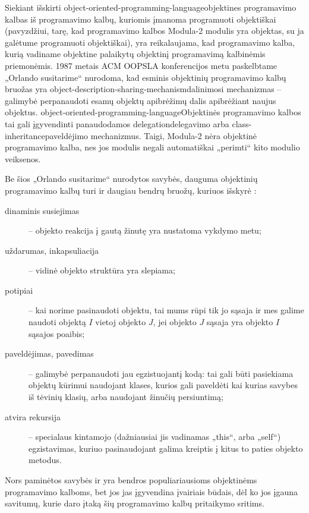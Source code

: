 Siekiant išskirti
\gls{object-oriented-programming-language}{objektines programavimo
kalbas} iš programavimo kalbų, kuriomis įmanoma programuoti
objektiškai (pavyzdžiui, tarę, kad programavimo kalbos Modula-2
modulis yra objektas, su ja galėtume programuoti objektiškai), yra
reikalaujama, kad programavimo kalba, kurią vadiname objektine
palaikytų objektinį programavimą kalbinėmis priemonėmis. 1987
metais ACM OOPSLA konferencijos metu paskelbtame „Orlando
susitarime“ 
\cite{Lieberman:1987:TO:62139.62144} nurodoma, kad esminis
objektinių programavimo kalbų bruožas yra 
\gls{object-description-sharing-mechanism}{dalinimosi 
mechanizmas} – galimybė perpanaudoti esamų objektų apibrėžimų dalis
apibrėžiant naujus objektus.
\gls{object-oriented-programming-language}{Objektinės programavimo kalbos}
tai gali įgyvendinti panaudodamos \gls{delegation}{delegavimo} arba
\gls{class-inheritance}{paveldėjimo} mechanizmus. Taigi, Modula-2 nėra
objektinė programavimo kalba, nes jos modulis negali automatiškai
„perimti“ kito modulio veiksenos.

Be šios „Orlando susitarime“ nurodytos savybės, dauguma
objektinių programavimo kalbų turi ir daugiau bendrų bruožų,
kuriuos išskyrė \cite[225-227]{types-and-programming-languages}:
\begin{description}
  \item[dinaminis susiejimas]  –
    objekto reakcija į gautą žinutę yra nustatoma vykdymo metu;
  \item[uždarumas, inkapsuliacija]  – vidinė objekto
    struktūra yra slepiama;
  \item[potipiai]  – kai norime pasinaudoti objektu, 
    tai mums rūpi tik jo sąsaja ir mes galime naudoti objektą $I$ vietoj
    objekto $J$, jei objekto $J$ sąsaja yra objekto $I$ sąsajos poaibis;
  \item[paveldėjimas, pavedimas]  – galimybė
    perpanaudoti jau egzistuojantį kodą: tai gali būti pasiekiama
    objektų kūrimui naudojant klases, kurios gali paveldėti kai kurias
    savybes iš tėvinių klasių, arba naudojant žinučių persiuntimą;
  \item[atvira rekursija]  – specialaus kintamojo
    (dažniausiai jis vadinamas „this“, arba „self“) egzistavimas, kuriuo
    pasinaudojant galima kreiptis į kitus to paties objekto metodus.
\end{description}
Nors paminėtos savybės ir yra bendros populiariausioms objektinėms
programavimo kalboms, bet jos jas įgyvendina įvairiais būdais,
dėl ko jos įgauna savitumų, kurie daro įtaką šių programavimo
kalbų pritaikymo sritims.

